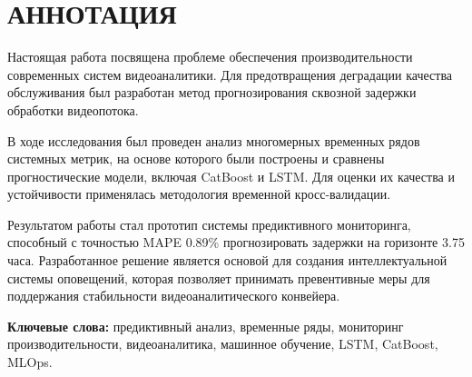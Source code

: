 \chapter*{АННОТАЦИЯ}

Настоящая работа посвящена проблеме обеспечения производительности современных систем видеоаналитики. Для предотвращения деградации качества обслуживания был разработан метод прогнозирования сквозной задержки обработки видеопотока.

В ходе исследования был проведен анализ многомерных временных рядов системных метрик, на основе которого были построены и сравнены прогностические модели, включая CatBoost и LSTM. Для оценки их качества и устойчивости применялась методология временной кросс-валидации.

Результатом работы стал прототип системы предиктивного мониторинга, способный с точностью MAPE 0.89\% прогнозировать задержки на горизонте 3.75 часа. Разработанное решение является основой для создания интеллектуальной системы оповещений, которая позволяет принимать превентивные меры для поддержания стабильности видеоаналитического конвейера.

\vspace*{1cm}
\textbf{Ключевые слова:} предиктивный анализ, временные ряды, мониторинг производительности, видеоаналитика, машинное обучение, LSTM, CatBoost, MLOps.

\newpage 